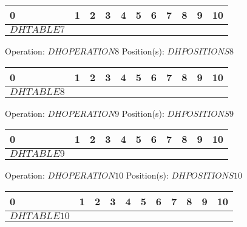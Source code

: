 \documentclass[12pt]{article}
\begin{document}
{{\begin{center}
\begin{tabular}{|P{0.75cm}|P{0.75cm}|P{0.75cm}|P{0.75cm}|P{0.75cm}|P{0.75cm}|P{0.75cm}|P{0.75cm}|P{0.75cm}|P{0.75cm}|P{0.75cm}|}
                     & 1 & 2 & 3 & 4 & 5 & 6 & 7 & 8 & 9 & 10  \\
                    \hline
                    $DHTABLE7$&&&&&&&&&& \\
                    \hline
                \end{tabular}
            \end{center}Operation: \underline{$DHOPERATION8$} \hspace{10px} Position(s): \underline{$DHPOSITIONS8$}
            \begin{center}
                \begin{tabular}{|P{0.75cm}|P{0.75cm}|P{0.75cm}|P{0.75cm}|P{0.75cm}|P{0.75cm}|P{0.75cm}|P{0.75cm}|P{0.75cm}|P{0.75cm}|P{0.75cm}|}
                     & 1 & 2 & 3 & 4 & 5 & 6 & 7 & 8 & 9 & 10  \\
                    \hline
                    $DHTABLE8$&&&&&&&&&& \\
                    \hline
                \end{tabular}
            \end{center}Operation: \underline{$DHOPERATION9$} \hspace{10px} Position(s): \underline{$DHPOSITIONS9$}
            \begin{center}
                \begin{tabular}{|P{0.75cm}|P{0.75cm}|P{0.75cm}|P{0.75cm}|P{0.75cm}|P{0.75cm}|P{0.75cm}|P{0.75cm}|P{0.75cm}|P{0.75cm}|P{0.75cm}|}
                     & 1 & 2 & 3 & 4 & 5 & 6 & 7 & 8 & 9 & 10  \\
                    \hline
                    $DHTABLE9$&&&&&&&&&& \\
                    \hline
                \end{tabular}
            \end{center}Operation: \underline{$DHOPERATION10$} \hspace{10px} Position(s): \underline{$DHPOSITIONS10$}
            \begin{center}
                \begin{tabular}{|P{0.75cm}|P{0.75cm}|P{0.75cm}|P{0.75cm}|P{0.75cm}|P{0.75cm}|P{0.75cm}|P{0.75cm}|P{0.75cm}|P{0.75cm}|P{0.75cm}|}
                     & 1 & 2 & 3 & 4 & 5 & 6 & 7 & 8 & 9 & 10  \\
                    \hline
                    $DHTABLE10$&&&&&&&&&& \\
                    \hline
                \end{tabular}
            \end{center}
        }
    }
\end{document}
